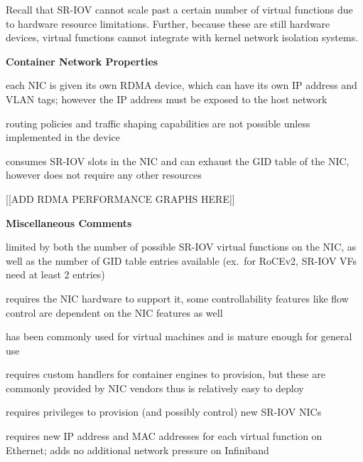 \documentclass[12pt,titlepage]{article}
\begin{document}
Recall that SR-IOV cannot scale past a certain number of virtual functions due to hardware resource limitations.
Further, because these are still hardware devices, virtual functions cannot integrate with kernel network isolation systems.

\noindent
\textbf{Container Network Properties}
\begin{description}[nolistsep,font={{\scshape\bfseries}}]
	\item[Network Isolation] each NIC is given its own RDMA device, which can have its own IP address and VLAN tags; however the IP address must be exposed to the host network
	\item[Controllability] routing policies and traffic shaping capabilities are not possible unless implemented in the device
	\item[Resource Utilization] consumes SR-IOV slots in the NIC and can exhaust the GID table of the NIC, however does not require any other resources
\end{description}

[[ADD RDMA PERFORMANCE GRAPHS HERE]]

\noindent
\textbf{Miscellaneous Comments}
\begin{description}[nolistsep,font={{\scshape\bfseries}}]
	\item[Scalability Limits] limited by both the number of possible SR-IOV virtual functions on the NIC, as well as the number of GID table entries available (ex.\ for RoCEv2, SR-IOV VFs need at least 2 entries)
	\item[Proprietary] requires the NIC hardware to support it, some controllability features like flow control are dependent on the NIC features as well
	\item[Maturity] has been commonly used for virtual machines and is mature enough for general use
	\item[Ease in Deployment] requires custom handlers for container engines to provision, but these are commonly provided by NIC vendors thus is relatively easy to deploy
	\item[Execution Privileges] requires privileges to provision (and possibly control) new SR-IOV NICs
	\item[Network Pressure] requires new IP address and MAC addresses for each virtual function on Ethernet; adds no additional network pressure on Infiniband
\end{description}
\end{document}
